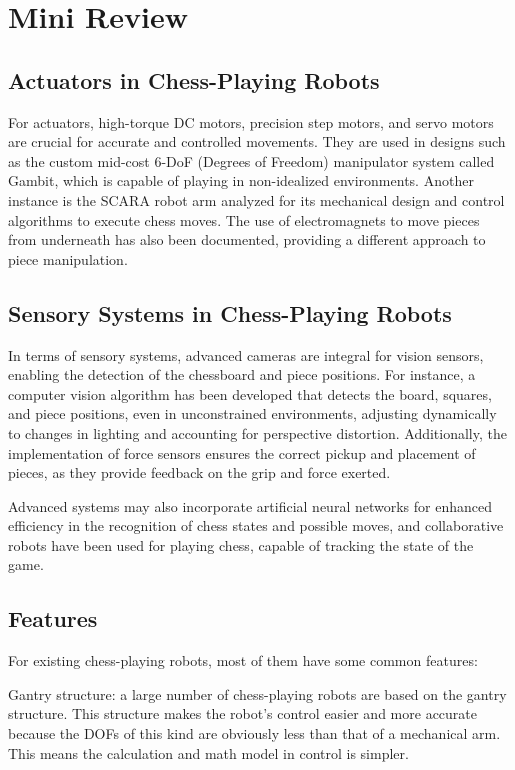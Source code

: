 \documentclass[10pt, a4paper, twocolumn]{article}
\begin{document}
\section{Mini Review}

\subsection{Actuators in Chess-Playing Robots}
For actuators, high-torque DC motors, precision step motors, and servo motors are crucial for accurate and controlled movements. They are used in designs such as the custom mid-cost 6-DoF (Degrees of Freedom) manipulator system called Gambit, which is capable of playing in non-idealized environments\cite{Gambit}. Another instance is the SCARA robot arm analyzed for its mechanical design and control algorithms to execute chess moves\cite{anh2016design}. The use of electromagnets to move pieces from underneath has also been documented, providing a different approach to piece manipulation\cite{chess_playing_robot_vub}.

\subsection{Sensory Systems in Chess-Playing Robots}
In terms of sensory systems, advanced cameras are integral for vision sensors, enabling the detection of the chessboard and piece positions. For instance, a computer vision algorithm has been developed that detects the board, squares, and piece positions, even in unconstrained environments, adjusting dynamically to changes in lighting and accounting for perspective distortion\cite{chen2019robust}. Additionally, the implementation of force sensors ensures the correct pickup and placement of pieces, as they provide feedback on the grip and force exerted\cite{omarsdottir2016axiomatic}.

Advanced systems may also incorporate artificial neural networks for enhanced efficiency in the recognition of chess states and possible moves, and collaborative robots have been used for playing chess, capable of tracking the state of the game\cite{kolosowski2020collaborative}.

\subsection{Features}
For existing chess-playing robots, most of them have some common features:

Gantry structure: a large number of chess-playing robots are based on the gantry structure. This structure makes the robot's control easier and more accurate because the DOFs of this kind are obviously less than that of a mechanical arm. This means the calculation and math model in control is simpler\cite{ACPR2015}.
\end{document}
